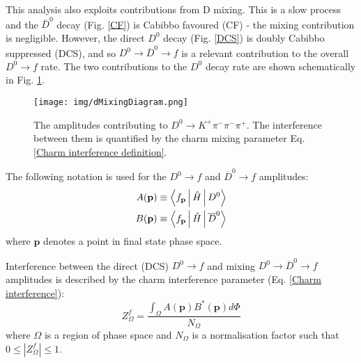 \documentclass[note.tex]{subfiles}
\begin{document}
This analysis also exploits contributions from D mixing.
This is a slow process and the $\overline{D}^0$ decay (Fig. \ref{CF}) is Cabibbo favoured (CF) - the mixing contribution is negligible. However, the direct $D^0$ decay (Fig. \ref{DCS}) is doubly Cabibbo suppressed (DCS), and so $D^0 \rightarrow \overline{D}^0 \rightarrow f$ is a relevant contribution to the overall $D^0\rightarrow f$ rate.
The two contributions to the $D^0$ decay rate are shown schematically in Fig. \ref{d mixing}.
\begin{figure}[htb!]
    \centering
    \texttt{[image: img/dMixingDiagram.png]}
    \caption{The amplitudes contributing to $D^0\rightarrow K^+\pi^-\pi^-\pi^+$.
        The interference between them is quantified by the charm mixing parameter Eq. \ref{Charm interference definition}.
    }
    \label{d mixing}
\end{figure}

The following notation is used for the $D^0\rightarrow f$ and $\overline{D}^0\rightarrow f$ amplitudes:
\begin{equation}
    \begin{aligned}
        A(\mathbf{p}) \equiv \Braket{f_{\mathbf{p}} | \hat{H} | D^0} \\
        B(\mathbf{p}) \equiv \Braket{f_{\mathbf{p}} | \hat{H} | \overline{D}^0}
    \end{aligned}
\end{equation}
where $\mathbf{p}$ denotes a point in final state phase space.

Interference between the direct (DCS) $D^0\rightarrow f$ and mixing $D^0\rightarrow \overline{D}^0 \rightarrow f$ amplitudes is described by the charm interference parameter (Eq. \ref{Charm interference}):
\begin{equation}
    \label{Charm interference definition}
    Z_\Omega^f = \frac{\int_\Omega A(\mathbf{p})B^*(\mathbf{p}) d\Phi}{N_\Omega}
\end{equation}
where $\Omega$ is a region of phase space and $N_\Omega$ is a normalisation factor such that $0 \leq |Z_\Omega^f| \leq 1$.
\end{document}
